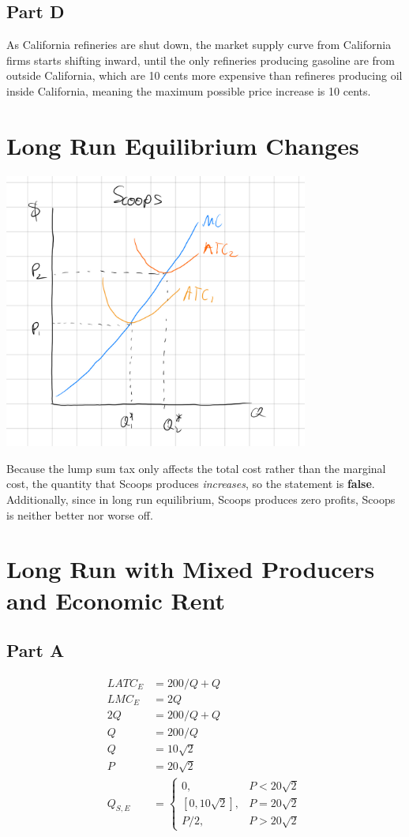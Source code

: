 \documentclass[8pt]{extarticle}
\begin{document}
{\subsection*{Part D}
As California refineries are shut down, the market supply curve from California firms starts shifting inward, until the only refineries producing gasoline are from outside California, which are 10 cents more expensive than refineres producing oil inside California, meaning the maximum possible price increase is 10 cents.
\section*{Long Run Equilibrium Changes}
\begin{center}
	\includegraphics[width=10cm]{HW8Q7}
\end{center}
Because the lump sum tax only affects the total cost rather than the marginal cost, the quantity that Scoops produces \textit{increases}, so the statement is \textbf{false}. Additionally, since in long run equilibrium, Scoops produces zero profits, Scoops is neither better nor worse off.
\section*{Long Run with Mixed Producers and Economic Rent}
\subsection*{Part A}%
\begin{align*}
	LATC_{E} &= 200/Q + Q \\
	LMC_{E} &= 2Q \\
	2Q &= 200/Q + Q \\
	Q &= 200/Q \\
	Q &= 10\sqrt{2}\\
	P &= 20 \sqrt{2}\\
	Q_{S,E} &= \begin{cases}
		0, & P < 20\sqrt{2}\\
		[0,10\sqrt{2}], & P = 20\sqrt{2} \\
		P/2, &P>20\sqrt{2}
	\end{cases}
\end{align*}
}
\end{document}
